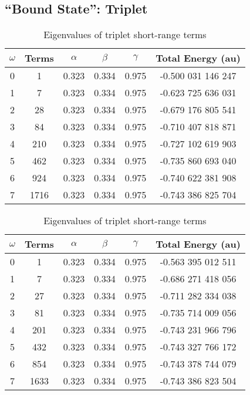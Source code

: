 \documentclass[Dissertation.tex]{subfiles}
\begin{document}
\subsection{``Bound State'': Triplet}

\setlength{\abovecaptionskip}{6pt}   %
\setlength{\belowcaptionskip}{6pt}   %
\begin{table}[H]
\centering
\begin{tabular}{c c c c c c}
\toprule
$\omega$ & Terms & $\alpha$ & $\beta$ & $\gamma$ & Total Energy (au) \\ [0.5ex]
\midrule
0 & 1 & 0.323 & 0.334 & 0.975 & -0.500 031 146 247 \\
1 & 7 & 0.323 & 0.334 & 0.975 & -0.623 725 636 031 \\
2 & 28 & 0.323 & 0.334 & 0.975 & -0.679 176 805 541 \\
3 & 84 & 0.323 & 0.334 & 0.975 & -0.710 407 818 871 \\
4 & 210 & 0.323 & 0.334 & 0.975 & -0.727 102 619 903 \\
5 & 462 & 0.323 & 0.334 & 0.975 & -0.735 860 693 040 \\
6 & 924 & 0.323 & 0.334 & 0.975 & -0.740 622 381 908 \\
7 & 1716 & 0.323 & 0.334 & 0.975 & -0.743 386 825 704 \\
\bottomrule
\end{tabular}
\caption{Eigenvalues of triplet short-range terms} %
\label{tab:BoundEnergy3}
\end{table}


\setlength{\abovecaptionskip}{6pt}   %
\setlength{\belowcaptionskip}{6pt}   %
\begin{table}[H]
\centering
\begin{tabular}{c c c c c c}
\toprule
$\omega$ & Terms & $\alpha$ & $\beta$ & $\gamma$ & Total Energy (au) \\ [0.5ex]
\midrule
0 & 1 & 0.323 & 0.334 & 0.975 & -0.563 395 012 511 \\
1 & 7 & 0.323 & 0.334 & 0.975 & -0.686 271 418 056 \\
2 & 27 & 0.323 & 0.334 & 0.975 & -0.711 282 334 038 \\
3 & 81 & 0.323 & 0.334 & 0.975 & -0.735 714 009 056 \\
4 & 201 & 0.323 & 0.334 & 0.975 & -0.743 231 966 796 \\
5 & 432 & 0.323 & 0.334 & 0.975 & -0.743 327 766 172 \\
6 & 854 & 0.323 & 0.334 & 0.975 & -0.743 378 744 079 \\
7 & 1633 & 0.323 & 0.334 & 0.975 & -0.743 386 823 504 \\
\bottomrule
\end{tabular}
\caption{Eigenvalues of triplet short-range terms} %
\label{tab:BoundEnergyTodd3}
\end{table}
\end{document}
